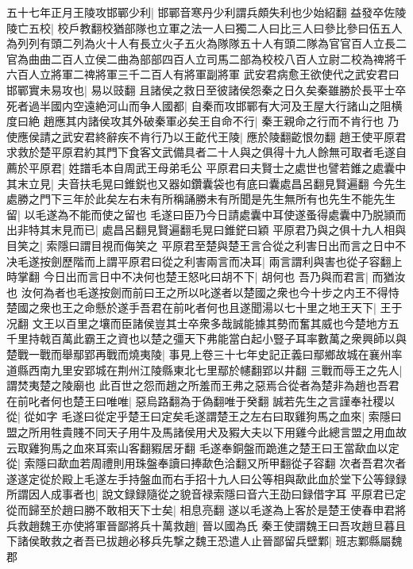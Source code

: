五十七年正月王陵攻邯鄲少利|{
	邯鄲音寒丹少利謂兵頗失利也少始紹翻}
益發卒佐陵陵亡五校|{
	校戶教翻校猶部隊也立軍之法一人曰獨二人曰比三人曰參比參曰伍五人為列列有頭二列為火十人有長立火子五火為隊隊五十人有頭二隊為官官百人立長二官為曲曲二百人立侯二曲為部部四百人立司馬二部為校校八百人立尉二校為禆將千六百人立將軍二禆將軍三千二百人有將軍副將軍}
武安君病愈王欲使代之武安君曰邯鄲實未易攻也|{
	易以豉翻}
且諸侯之救日至彼諸侯怨秦之日久矣秦雖勝於長平士卒死者過半國内空遠絶河山而争人國都|{
	自秦而攻邯鄲有大河及王屋大行諸山之阻横度曰絶}
趙應其内諸侯攻其外破秦軍必矣王自命不行|{
	秦王親命之行而不肯行也}
乃使應侯請之武安君終辭疾不肯行乃以王齕代王陵|{
	應於陵翻齕恨勿翻}
趙王使平原君求救於楚平原君約其門下食客文武備具者二十人與之俱得十九人餘無可取者毛遂自薦於平原君|{
	姓譜毛本自周武王母弟毛公}
平原君曰夫賢士之處世也譬若錐之處囊中其末立見|{
	夫音扶毛晃曰錐鋭也又器如鑽囊袋也有底曰囊處昌呂翻見賢遍翻}
今先生處勝之門下三年於此矣左右未有所稱誦勝未有所聞是先生無所有也先生不能先生留|{
	以毛遂為不能而使之留也}
毛遂曰臣乃今日請處囊中耳使遂蚤得處囊中乃脱頴而出非特其末見而已|{
	處昌呂翻見賢遍翻毛晃曰錐鋩曰穎}
平原君乃與之俱十九人相與目笑之|{
	索隱曰謂目視而侮笑之}
平原君至楚與楚王言合從之利害日出而言之日中不决毛遂按劍歷階而上謂平原君曰從之利害兩言而决耳|{
	兩言謂利與害也從子容翻上時掌翻}
今日出而言日中不决何也楚王怒叱曰胡不下|{
	胡何也}
吾乃與而君言|{
	而猶汝也}
汝何為者也毛遂按劍而前曰王之所以叱遂者以楚國之衆也今十步之内王不得恃楚國之衆也王之命懸於遂手吾君在前叱者何也且遂聞湯以七十里之地王天下|{
	王于况翻}
文王以百里之壤而臣諸侯豈其士卒衆多哉誠能據其勢而奮其威也今楚地方五千里持戟百萬此霸王之資也以楚之彊天下弗能當白起小豎子耳率數萬之衆興師以與楚戰一戰而舉鄢郢再戰而燒夷陵|{
	事見上卷三十七年史記正義曰鄢鄉故城在襄州率道縣西南九里安郢城在荆州江陵縣東北七里鄢於幰翻郢以井翻}
三戰而辱王之先人|{
	謂焚夷楚之陵廟也}
此百世之怨而趙之所羞而王弗之惡焉合從者為楚非為趙也吾君在前叱者何也楚王曰唯唯|{
	惡烏路翻為于偽翻唯于癸翻}
誠若先生之言謹奉社稷以從|{
	從如字}
毛遂曰從定乎楚王曰定矣毛遂謂楚王之左右曰取雞狗馬之血來|{
	索隱曰盟之所用牲貴賤不同天子用牛及馬諸侯用犬及豭大夫以下用雞今此總言盟之用血故云取雞狗馬之血來耳索山客翻豭居牙翻}
毛遂奉銅盤而跪進之楚王曰王當歃血以定從|{
	索隱曰歃血若周禮則用珠盤奉讀曰捧歃色洽翻又所甲翻從子容翻}
次者吾君次者遂遂定從於殿上毛遂左手持盤血而右手招十九人曰公等相與歃此血於堂下公等録録所謂因人成事者也|{
	說文録録隨從之貌音禄索隱曰音六王劭曰録借字耳}
平原君已定從而歸至於趙曰勝不敢相天下士矣|{
	相息亮翻}
遂以毛遂為上客於是楚王使春申君將兵救趙魏王亦使將軍晉鄙將兵十萬救趙|{
	晉以國為氏}
秦王使謂魏王曰吾攻趙旦暮且下諸侯敢救之者吾已拔趙必移兵先撃之魏王恐遣人止晉鄙留兵壁鄴|{
	班志鄴縣屬魏郡}
